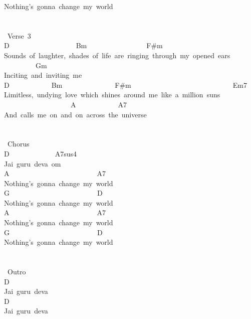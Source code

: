 {Nothing's\ gonna\ change\ my\ world\\
\\
\\
\lbrack\ Verse\ 3\rbrack\\
D\ \ \ \ \ \ \ \ \ \ \ \ \ \ \ \ \ \ \ Bm\ \ \ \ \ \ \ \ \ \ \ \ \ \ \ \ \ F\#m\\
Sounds\ of\ laughter,\ shades\ of\ life\ are\ ringing\ through\ my\ opened\ ears\\
\ \ \ \ \ \ \ \ \ Gm\\
Inciting\ and\ inviting\ me\\
D\ \ \ \ \ \ \ \ \ \ \ \ Bm\ \ \ \ \ \ \ \ \ \ \ \ \ \ \ F\#m\ \ \ \ \ \ \ \ \ \ \ \ \ \ \ \ \ \ \ \ \ \ \ \ \ \ \ \ \ Em7\\
Limitless,\ undying\ love\ which\ shines\ around\ me\ like\ a\ million\ suns\\
 \ \ \ \ \ \ \ \ \ \ \ \ \ \ \ \ \ \ \ A\ \ \ \ \ \ \ \ \ \ \ \ A7\\
And\ calls\ me\ on\ and\ on\ across\ the\ universe\\
\ \ \ \ \\
\ \ \ \ \\
\lbrack\ Chorus\rbrack\\
D\ \ \ \ \ \ \ \ \ \ \ \ \ A7sus4\\
Jai\ guru\ deva\ om\\
A\ \ \ \ \ \ \ \ \ \ \ \ \ \ \ \ \ \ \ \ \ \ \ \ \ A7\\
Nothing's\ gonna\ change\ my\ world\\
G\ \ \ \ \ \ \ \ \ \ \ \ \ \ \ \ \ \ \ \ \ \ \ \ \ D\\
Nothing's\ gonna\ change\ my\ world\\
A\ \ \ \ \ \ \ \ \ \ \ \ \ \ \ \ \ \ \ \ \ \ \ \ \ A7\\
Nothing's\ gonna\ change\ my\ world\\
G\ \ \ \ \ \ \ \ \ \ \ \ \ \ \ \ \ \ \ \ \ \ \ \ \ D\\
Nothing's\ gonna\ change\ my\ world\\
\\
\\
\lbrack\ Outro\rbrack\\
D\\
Jai\ guru\ deva\\
D\\
Jai\ guru\ deva\\}
